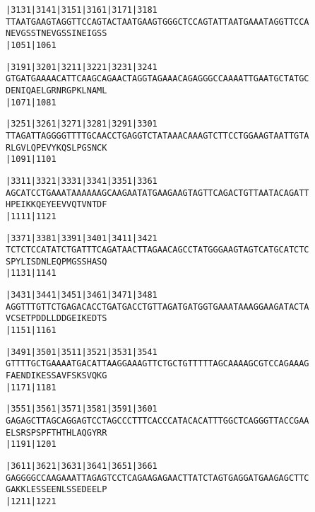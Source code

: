\documentclass{article}
\begin{document}
\newpage
\begin{alltt}
|3131     |3141     |3151     |3161     |3171     |3181     
TTAATGAAGTAGGTTCCAGTACTAATGAAGTGGGCTCCAGTATTAATGAAATAGGTTCCA
  N  E  V  G  S  S  T  N  E  V  G  S  S  I  N  E  I  G  S  S
                    |1051                         |1061     

|3191     |3201     |3211     |3221     |3231     |3241     
GTGATGAAAACATTCAAGCAGAACTAGGTAGAAACAGAGGGCCAAAATTGAATGCTATGC
  D  E  N  I  Q  A  E  L  G  R  N  R  G  P  K  L  N  A  M  L
                    |1071                         |1081     

|3251     |3261     |3271     |3281     |3291     |3301     
TTAGATTAGGGGTTTTGCAACCTGAGGTCTATAAACAAAGTCTTCCTGGAAGTAATTGTA
  R  L  G  V  L  Q  P  E  V  Y  K  Q  S  L  P  G  S  N  C  K
                    |1091                         |1101     

|3311     |3321     |3331     |3341     |3351     |3361     
AGCATCCTGAAATAAAAAAGCAAGAATATGAAGAAGTAGTTCAGACTGTTAATACAGATT
  H  P  E  I  K  K  Q  E  Y  E  E  V  V  Q  T  V  N  T  D  F
                    |1111                         |1121     

|3371     |3381     |3391     |3401     |3411     |3421     
TCTCTCCATATCTGATTTCAGATAACTTAGAACAGCCTATGGGAAGTAGTCATGCATCTC
  S  P  Y  L  I  S  D  N  L  E  Q  P  M  G  S  S  H  A  S  Q
                    |1131                         |1141     

|3431     |3441     |3451     |3461     |3471     |3481     
AGGTTTGTTCTGAGACACCTGATGACCTGTTAGATGATGGTGAAATAAAGGAAGATACTA
  V  C  S  E  T  P  D  D  L  L  D  D  G  E  I  K  E  D  T  S
                    |1151                         |1161     

|3491     |3501     |3511     |3521     |3531     |3541     
GTTTTGCTGAAAATGACATTAAGGAAAGTTCTGCTGTTTTTAGCAAAAGCGTCCAGAAAG
  F  A  E  N  D  I  K  E  S  S  A  V  F  S  K  S  V  Q  K  G
                    |1171                         |1181     

|3551     |3561     |3571     |3581     |3591     |3601     
GAGAGCTTAGCAGGAGTCCTAGCCCTTTCACCCATACACATTTGGCTCAGGGTTACCGAA
  E  L  S  R  S  P  S  P  F  T  H  T  H  L  A  Q  G  Y  R  R
                    |1191                         |1201     

|3611     |3621     |3631     |3641     |3651     |3661     
GAGGGGCCAAGAAATTAGAGTCCTCAGAAGAGAACTTATCTAGTGAGGATGAAGAGCTTC
  G  A  K  K  L  E  S  S  E  E  N  L  S  S  E  D  E  E  L  P
                    |1211                         |1221     

\end{alltt}
\end{document}
